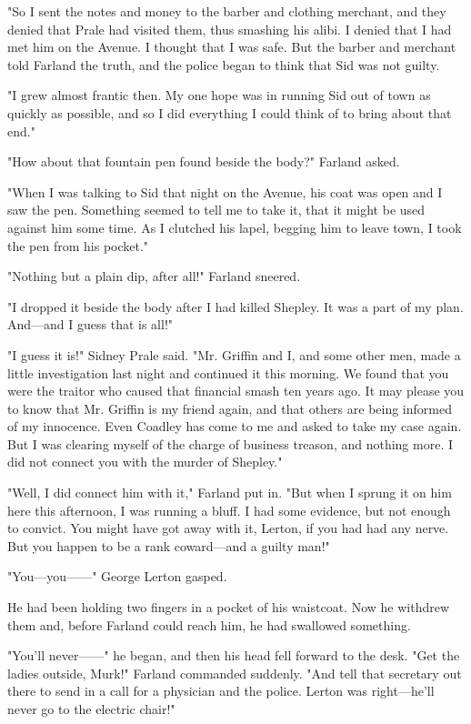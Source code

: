 \documentclass{novel}
\begin{document}
"So I sent the notes and money to the barber and clothing merchant, and they denied that Prale had visited them, thus smashing his alibi. I denied that I had met him on the Avenue. I thought that I was safe. But the barber and merchant told Farland the truth, and the police began to think that Sid was not guilty.

"I grew almost frantic then. My one hope was in running Sid out of town as quickly as possible, and so I did everything I could think of to bring about that end."

"How about that fountain pen found beside the body?" Farland asked.

"When I was talking to Sid that night on the Avenue, his coat was open and I saw the pen. Something seemed to tell me to take it, that it might be used against him some time. As I clutched his lapel, begging him to leave town, I took the pen from his pocket."

"Nothing but a plain dip, after all!" Farland sneered.

"I dropped it beside the body after I had killed Shepley. It was a part of my plan. And---and I guess that is all!"

"I guess it is!" Sidney Prale said. "Mr. Griffin and I, and some other men, made a little investigation last night and continued it this morning. We found that you were the traitor who caused that financial smash ten years ago. It may please you to know that Mr. Griffin is my friend again, and that others are being informed of my innocence. Even Coadley has come to me and asked to take my case again. But I was clearing myself of the charge of business treason, and nothing more. I did not connect you with the murder of Shepley."

"Well, I did connect him with it," Farland put in. "But when I sprung it on him here this afternoon, I was running a bluff. I had some evidence, but not enough to convict. You might have got away with it, Lerton, if you had had any nerve. But you happen to be a rank coward---and a guilty man!"

"You---you------" George Lerton gasped.

He had been holding two fingers in a pocket of his waistcoat. Now he withdrew them and, before Farland could reach him, he had swallowed something.

"You'll never------" he began, and then his head fell forward to the desk. "Get the ladies outside, Murk!" Farland commanded suddenly. "And tell that secretary out there to send in a call for a physician and the police. Lerton was right---he'll never go to the electric chair!"
\end{document}
